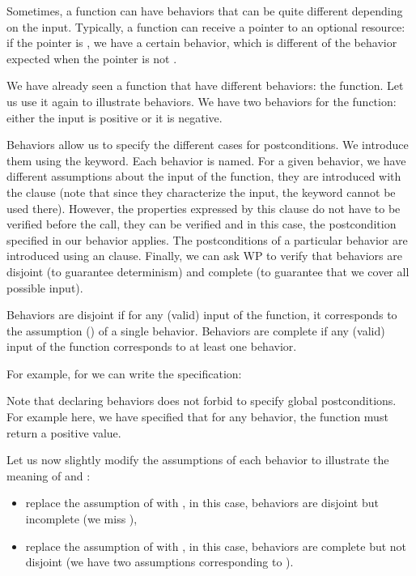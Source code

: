 Sometimes, a function can have behaviors that can be quite different
depending on the input. Typically, a function can receive a pointer to
an optional resource: if the pointer is , we have a
certain behavior, which is different of the behavior expected when
the pointer is not .

We have already seen a function that have different behaviors: the
 function. Let us use it again to illustrate behaviors. We
have two behaviors for the  function: either the input is
positive or it is negative.

Behaviors allow us to specify the different cases for postconditions. We
introduce them using the  keyword. Each behavior
is named. For a given behavior, we have different assumptions about the
input of the function, they are introduced with the clause
 (note that since they characterize the input, the
keyword  cannot be used there). However,
the properties expressed by this clause do not have to be verified before
the call, they can be verified and in this case, the postcondition
specified in our behavior applies. The postconditions of a particular
behavior are introduced using an  clause. Finally, we can ask WP
to verify that behaviors are disjoint (to guarantee determinism) and
complete (to guarantee that we cover all possible input).

Behaviors are disjoint if for any (valid) input of the function, it
corresponds to the assumption () of a single behavior.
Behaviors are complete if any (valid) input of the function corresponds
to at least one behavior.

For example, for  we can write the specification:






Note that declaring behaviors does not forbid to specify global postconditions.
For example here, we have specified that for any behavior, the function must
return a positive value.



Let us now slightly modify the assumptions of each behavior to illustrate
the meaning of  and :
\begin{itemize}
\item
  replace the assumption of  with
  , in this case, behaviors are
  disjoint but incomplete (we miss ),
\item
  replace the assumption of  with
  , in this case, behaviors are
  complete but not disjoint (we have two assumptions corresponding
  to ).
\end{itemize}


